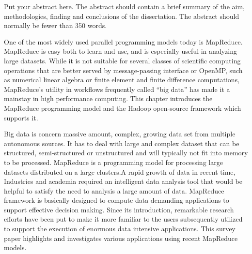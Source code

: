 \documentclass[11pt]{book}
\begin{document}


 Put your abstract  here.  The abstract should contain a brief summary of the aim, methodologies, 
finding and conclusions of the dissertation.  The abstract should normally be fewer than 350 words.


One of the most widely used parallel programming models today is MapReduce. MapReduce is easy both to learn and use, and is especially useful in analyzing large datasets. While it is not suitable for several classes of scientific computing operations that are better served by message-passing interface or OpenMP, such as numerical linear algebra or finite element and finite difference computations, MapReduce's utility in workflows frequently called “big data” has made it a mainstay in high performance computing. This chapter introduces the MapReduce programming model and the Hadoop open-source framework which supports it.

Big data is concern massive amount, complex, growing data set from multiple autonomous sources. It has to deal with large
and complex dataset that can be structured, semi-structured or unstructured and will typically not fit into memory to be processed.
MapReduce is a programming model for processing large datasets distributed on a large clusters.A rapid growth of data in recent time,
Industries and academia required an intelligent data analysis tool that would be helpful to satisfy the need to analysis a large amount of
data. MapReduce framework is basically designed to compute data demanding applications to support effective decision making. Since
its introduction, remarkable research efforts have been put to make it more familiar to the users subsequently utilized to support the
execution of enormous data intensive applications. This survey paper highlights and investigates various applications using recent
MapReduce models.







\setcounter{secnumdepth}{3} %
\setcounter{tocdepth}{3}    %
\tableofcontents            %
\end{document}

